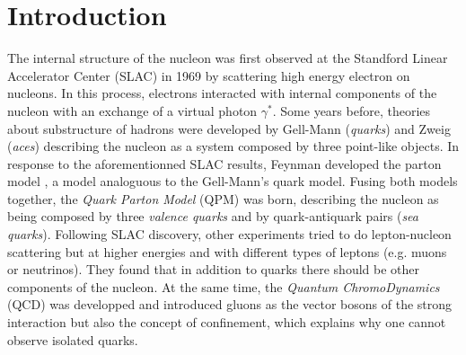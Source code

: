 
\chapter*{Introduction} %

\label{ch:intro} %


The internal structure of the nucleon was first observed at the Standford Linear Accelerator Center (SLAC) in 1969 \cite{SLAC} by scattering high energy electron on nucleons. In this process, electrons interacted with internal components of the nucleon with an exchange of a virtual photon $\gamma^*$. Some years before, theories about substructure of hadrons were developed by Gell-Mann (\textit{quarks}) \cite{Gellman} and Zweig (\textit{aces}) \cite{Zweig} describing the nucleon as a system composed by three point-like objects. In response to the aforementionned SLAC results, Feynman developed the parton model \cite{PartonModel}, a model analoguous to the Gell-Mann's quark model. Fusing both models together, the \textit{Quark Parton Model} (QPM) was born, describing the nucleon as being composed by three \textit{valence quarks} and by quark-antiquark pairs (\textit{sea quarks}). Following SLAC discovery, other experiments tried to do lepton-nucleon scattering but at higher energies and with different types of leptons (e.g. muons or neutrinos). They found that in addition to quarks there should be other components of the nucleon. At the same time, the \textit{Quantum ChromoDynamics} (QCD) was developped and introduced gluons as the vector bosons of the strong interaction but also the concept of confinement, which explains why one cannot observe isolated quarks.


